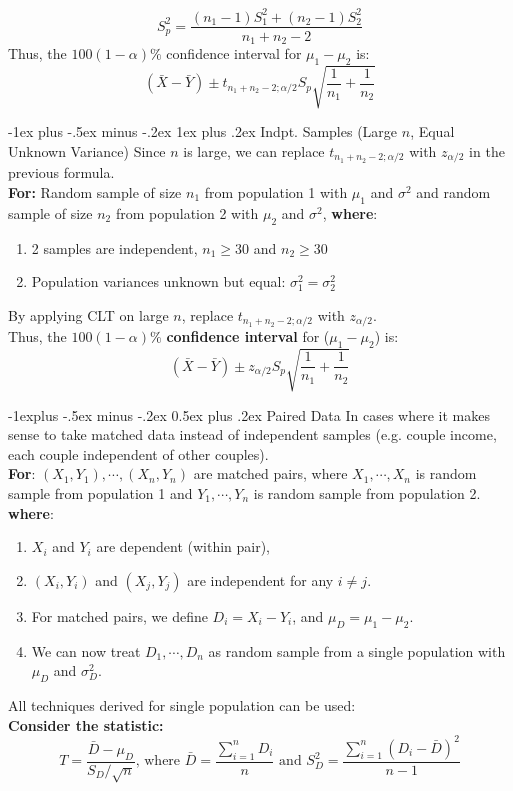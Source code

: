 \documentclass[12pt, landscape]{article}
\makeatletter
\renewcommand{\subsection}{\@startsection{subsection}{2}{0.1mm}%
                                {-1explus -.5ex minus -.2ex}%
                                {0.5ex plus .2ex}%
                                {\normalfont\normalsize\bfseries}}
\renewcommand{\subsubsection}{\@startsection{subsubsection}{3}{0.1mm}%
                                {-1ex plus -.5ex minus -.2ex}%
                                {1ex plus .2ex}%
                                {\normalfont\small\bfseries}}
\makeatother
\begin{document}
\begin{multicols*}{3}
\[S_p^2 = \frac{(n_1 - 1)S_1^2 + (n_2 - 1)S_2^2}{n_1 + n_2 - 2}\]
Thus, the $100(1-\alpha)\%$ confidence interval for $\mu_1 - \mu_2$ is:
\[(\bar{X} - \bar{Y}) \pm t_{n_1 + n_2 - 2; \alpha/2} S_p \sqrt{\frac{1}{n_1} + \frac{1}{n_2}}\]


\subsubsection{Indpt. Samples (Large $n$, Equal Unknown Variance)}
Since $n$ is large, we can replace $ t_{n_1 + n_2 - 2; \alpha/2}$ with $z_{
\alpha/2}$ in the previous formula. \\ \smallskip
\textbf{For:} Random sample of size $n_1$ from population 1 with $\mu_1$ and $\sigma^2$ and random sample of size $n_2$ from population 2 with $\mu_2$ and $\sigma^2$, \textbf{where}:
\begin{enumerate}
    \item 2 samples are independent, $n_1 \geq 30$ and $n_2 \geq 30$
    \item Population variances unknown but equal: $\sigma_1 ^2 = \sigma_2 ^2$
\end{enumerate}
By applying CLT on large $n$, replace $t_{n_1 + n_2 - 2; \alpha/2}$ with $z_{\alpha/2}$. \\
Thus, the $100(1-\alpha)\%$ \textbf{confidence interval} for ($\mu_1 - \mu_2$) is:
\[(\bar{X} - \bar{Y}) \pm z_{\alpha/2} S_p \sqrt{\frac{1}{n_1} + \frac{1}{n_2}}\]


\null \null
\columnbreak


\subsection{Paired Data}
In cases where it makes sense to take matched data instead of independent samples (e.g. couple income, each couple independent of other couples).
\\ \smallskip
\textbf{For}: $(X_1, Y_1), \cdots, (X_n, Y_n)$ are matched pairs, where $X_1, \cdots, X_n$ is random sample from population 1 and $Y_1, \cdots, Y_n$ is random sample from population 2.
\\ \smallskip
 \textbf{where}:
\smallskip
\begin{enumerate}
    \item $X_i$ and $Y_i$ are dependent (within pair),
    \item $(X_i, Y_i)$ and $(X_j, Y_j)$ are independent for any $i \neq j$.
    \item For matched pairs, we define $D_i = X_i - Y_i$, and  $\mu_D = \mu_1 - \mu_2$.
    \item We can now treat $D_1, \cdots, D_n$ as random sample from a single population with $\mu_D$ and $\sigma_D^2$. 
\end{enumerate}
\smallskip
All techniques derived for single population can be used:
\medskip
\\ \textbf{Consider the statistic:}
\[T = \frac{\bar{D} - \mu_D}{S_D / \sqrt{n}} \text{, where } \bar{D} = \frac{\sum _{i=1} ^n D_i}{n} \text{ and } S_D^2 = \frac{\sum _{i=1} ^n (D_i - \bar{D})^2}{n-1}\]


\end{multicols*}
\end{document}
